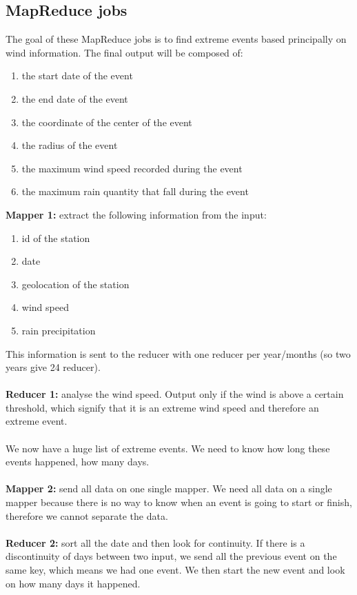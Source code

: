 \documentclass[12pt]{article}
\begin{document}
\subsection{MapReduce jobs}
\noindent
The goal of these MapReduce jobs is to find extreme events based principally on wind information. The final output will be composed of:
\begin{enumerate}
\item the start date of the event
\item the end date of the event
\item the coordinate of the center of the event
\item the radius of the event
\item the maximum wind speed recorded during the event
\item the maximum rain quantity that fall during the event
\end{enumerate}
\noindent
\textbf{Mapper 1:} extract the following information from the input:
\begin{enumerate}
\item id of the station
\item date
\item geolocation of the station
\item wind speed
\item rain precipitation
\end{enumerate}
\noindent
This information is sent to the reducer with one reducer per year/months (so two years give 24 reducer).\\
\\
\textbf{Reducer 1:} analyse the wind speed. Output only if the wind is above a certain threshold, which signify that it is an extreme wind speed and therefore an extreme event.\\
\\
We now have a huge list of extreme events. We need to know how long these events happened, how many days.\\
\\
\textbf{Mapper 2:} send all data on one single mapper. We need all data on a single mapper because there is no way to know when an event is going to start or finish, therefore we cannot separate the data.\\
\\
\textbf{Reducer 2:} sort all the date and then look for continuity. If there is a discontinuity of days between two input, we send all the previous event on the same key, which means we had one event. We then start the new event and look on how many days it happened.\\
\end{document}
